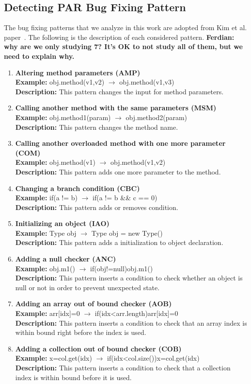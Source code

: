 \documentclass{sig-alternate-05-2015}
\newcommand{\todo}[1]
  {{\scriptsize \textbf{\color{red} {#1}}}}
\begin{document}
\subsection{Detecting PAR Bug Fixing Pattern}\label{sec:method}
The bug fixing patterns that we analyze in this work are adopted from Kim et
al. paper~\cite{kim2013}. The following is the description of each considered
pattern. 
\todo{Ferdian: why are we only studying 7?  It's OK to not study all of them,
  but we need to explain why.}
  \begin{enumerate}
	\item {\bf Altering method parameters (AMP)}\\
	{\bf Example:} obj.method(v1,v2) $\rightarrow$ obj.method(v1,v3)\\
	{\bf Description:} This pattern changes the input for method parameters.
	\item {\bf Calling another method with the same parameters (MSM)}\\
	{\bf Example:} obj.method1(param) $\rightarrow$ obj.method2(param)\\
	{\bf Description:} This pattern changes the method name.
	\item {\bf Calling another overloaded method with one more parameter (COM)}\\
	{\bf Example:} obj.method(v1) $\rightarrow$ obj.method(v1,v2)\\
	{\bf Description:} This pattern adds one more parameter to the method.
	\item {\bf Changing a branch condition (CBC)}\\
	{\bf Example:} if(a != b) $\rightarrow$ if(a != b \&\& c == 0)\\
	{\bf Description:} This pattern adds or removes condition.
	\item {\bf Initializing an object (IAO)}\\
	{\bf Example:} Type obj $\rightarrow$ Type obj = new Type()\\
	{\bf Description:} This pattern adds a initialization to object declaration.
	\item {\bf Adding a null checker (ANC)}\\
	{\bf Example:} obj.m1() $\rightarrow$ if(obj!=null){obj.m1()}\\
	{\bf Description:} This pattern inserts a condition to check whether an object is null or not in order to prevent unexpected state.
	\item {\bf Adding an array out of bound checker (AOB)}\\
	{\bf Example:} arr[idx]=0 $\rightarrow$ if(idx<arr.length){arr[idx]=0}\\
	{\bf Description:} This pattern inserts a condition to check that an array index is within bound right before the index is used.
	\item {\bf Adding a collection out of bound checker (COB)}\\
	{\bf Example:} x=col.get(idx) $\rightarrow$ if(idx<col.size()){x=col.get(idx)}\\
	{\bf Description:} This pattern inserts a condition to check that a collection index is within bound before it is used.
\end{enumerate}
\end{document}
